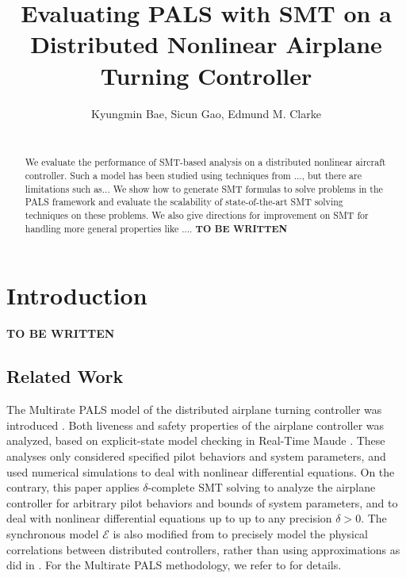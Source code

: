 \documentclass{sig-alternate}
\begin{document}
\title{Evaluating PALS with SMT on a Distributed Nonlinear Airplane Turning Controller
}

\author{
Kyungmin Bae, Sicun Gao, Edmund M. Clarke\\
\\
}

\maketitle
\begin{abstract}
We evaluate the performance of SMT-based analysis on a distributed
nonlinear aircraft controller. Such a model has been studied using
techniques from ..., but there are limitations such as... We show how
to generate SMT formulas to solve problems in the PALS framework and
evaluate the scalability of state-of-the-art SMT solving techniques on
these problems. We also give directions for improvement on SMT for
handling more general properties like ....
\textbf{TO BE WRITTEN}
\end{abstract}

\section{Introduction}

\textbf{TO BE WRITTEN}




\subsection{Related Work}

The Multirate PALS model of the distributed airplane
turning controller was introduced \cite{ftscs-journal}.
Both liveness and safety properties of the airplane controller was analyzed,
based on explicit-state model checking in Real-Time Maude \cite{journ-rtm}.
These analyses only considered  specified pilot behaviors and system parameters,
and used numerical simulations to deal with nonlinear differential equations.
%
On the contrary, 
this paper applies $\delta$-complete SMT solving 
to analyze the airplane controller
for arbitrary pilot behaviors and bounds of system parameters,
and to deal with nonlinear differential equations up to 
up to any precision $\delta > 0$.
The synchronous model $\mathcal{E}$ 
is also modified from \cite{ftscs-journal} to precisely model
the physical correlations between distributed controllers,
rather than using approximations as did in \cite{ftscs-journal}.
For the Multirate PALS methodology,
we refer to \cite{ftscs-journal,mr-pals-journal,pals-tcs} for details.
\end{document}
